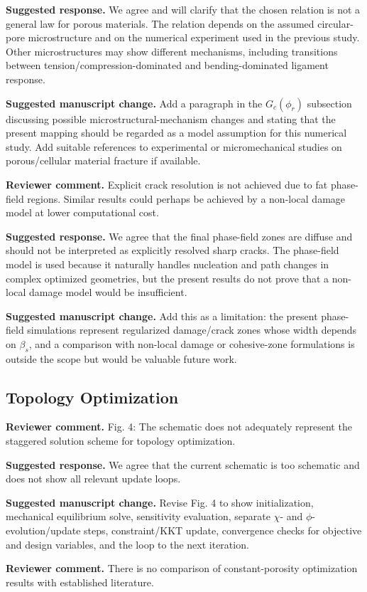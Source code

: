 \documentclass[11pt,a4paper]{article}
\newcommand{\comment}[1]{\par\noindent\textbf{Reviewer comment.} #1\par}
\newcommand{\response}[1]{\par\noindent\textbf{Suggested response.} #1\par}
\newcommand{\change}[1]{\par\noindent\textbf{Suggested manuscript change.} #1\par}
\begin{document}
\response{We agree and will clarify that the chosen relation is not a general
law for porous materials. The relation depends on the assumed circular-pore
microstructure and on the numerical experiment used in the previous study.
Other microstructures may show different mechanisms, including transitions
between tension/compression-dominated and bending-dominated ligament response.}

\change{Add a paragraph in the \(G_c(\phi_r)\) subsection discussing possible
microstructural-mechanism changes and stating that the present mapping should
be regarded as a model assumption for this numerical study. Add suitable
references to experimental or micromechanical studies on porous/cellular
material fracture if available.}

\comment{Explicit crack resolution is not achieved due to fat phase-field
regions. Similar results could perhaps be achieved by a non-local damage model
at lower computational cost.}

\response{We agree that the final phase-field zones are diffuse and should not
be interpreted as explicitly resolved sharp cracks. The phase-field model is
used because it naturally handles nucleation and path changes in complex
optimized geometries, but the present results do not prove that a non-local
damage model would be insufficient.}

\change{Add this as a limitation: the present phase-field simulations represent
regularized damage/crack zones whose width depends on \(\beta_s\), and a
comparison with non-local damage or cohesive-zone formulations is outside the
scope but would be valuable future work.}

\subsection*{Topology Optimization}

\comment{Fig. 4: The schematic does not adequately represent the staggered
solution scheme for topology optimization.}

\response{We agree that the current schematic is too schematic and does not
show all relevant update loops.}

\change{Revise Fig. 4 to show initialization, mechanical equilibrium solve,
sensitivity evaluation, separate \(\chi\)- and \(\phi\)-evolution/update steps,
constraint/KKT update, convergence checks for objective and design variables,
and the loop to the next iteration.}

\comment{There is no comparison of constant-porosity optimization results with
established literature.}
\end{document}
